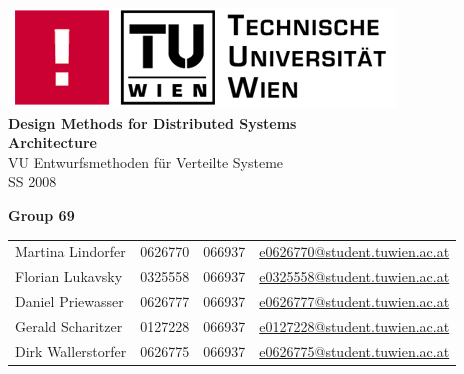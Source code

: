 \documentclass[a4paper]{article}
\begin{document}
\begin{titlepage}
	\bigskip
	\bigskip
	\bigskip
	\begin{center}
		\includegraphics{informatik-tuwien.png}\\
		\vspace{1cm}
		\Huge{\textsf{\textbf{Design Methods for Distributed Systems\\}}}
		\vspace{1cm}
		\huge{\textsf{\textbf{Architecture\\}}}
		\vspace{1cm}
		\LARGE{\textsf{VU Entwurfsmethoden f\"{u}r Verteilte Systeme\\}}
		\vspace{1cm}
		\Large{\textsf{SS 2008\\}}
	\end{center}
	\vfill
	\begin{center}
		\large{\textsf{\textbf{Group 69}}}
	\end{center}
	\begin{tabular}{llll}
	\textsf{Martina Lindorfer} & \textsf{0626770} & \textsf{066937} & \url{e0626770@student.tuwien.ac.at}\\
	\textsf{Florian Lukavsky} & \textsf{0325558} & \textsf{066937} & \url{e0325558@student.tuwien.ac.at}\\
	\textsf{Daniel Priewasser} & \textsf{0626777} & \textsf{066937} & \url{e0626777@student.tuwien.ac.at}\\
	\textsf{Gerald Scharitzer} & \textsf{0127228} & \textsf{066937} & \url{e0127228@student.tuwien.ac.at}\\
	\textsf{Dirk Wallerstorfer} & \textsf{0626775} & \textsf{066937} & \url{e0626775@student.tuwien.ac.at}\\
	\end{tabular}
\end{titlepage}

\clearpage

\pagestyle{fancy}				
\fancyfoot{}
\tableofcontents

\newpage

\end{document}
